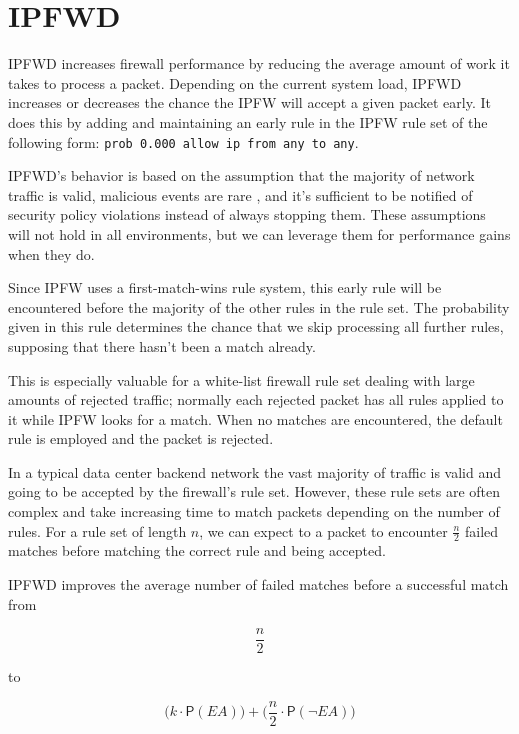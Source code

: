 \documentclass[journal]{IEEEtran}
\begin{document}
\section{IPFWD}

  IPFWD increases firewall performance by reducing the average amount of work
  it takes to process a packet. Depending on the current system load, IPFWD
  increases or decreases the chance the IPFW will accept a given packet early.
  It does this by adding and maintaining an early rule in the IPFW rule set of
  the following form: \verb|prob 0.000 allow ip from any to any|. 

  IPFWD's behavior is based on the assumption that the majority of network
  traffic is valid, malicious events are rare \cite{networktrafficanalysis},
  and it's sufficient to be notified of security policy violations instead of
  always stopping them. These assumptions will not hold in all environments,
  but we can leverage them for performance gains when they do.

  Since IPFW uses a first-match-wins rule system, this early rule will be
  encountered before the majority of the other rules in the rule set.  The
  probability given in this rule determines the chance that we skip processing
  all further rules, supposing that there hasn't been a match already.  

  This is especially valuable for a white-list firewall rule set dealing with
  large amounts of rejected traffic; normally each rejected packet has all
  rules applied to it while IPFW looks for a match.  When no matches are
  encountered, the default rule is employed and the packet is rejected. 

  In a typical data center backend network the vast majority of traffic is
  valid and going to be accepted by the firewall's rule set. However, these
  rule sets are often complex and take increasing time to match packets
  depending on the number of rules. For a rule set of length $n$, we can expect
  to a packet to encounter $\frac{n}{2}$ failed matches before matching the
  correct rule and being accepted.

  IPFWD improves the average number of failed matches before a successful match
  from

  \[
  \frac{n}{2}
  \]

  to

  \[
  \Big(k \cdot \mathsf{P}(\textit{EA})\Big) + 
  \Big(\frac{n}{2} \cdot \mathsf{P}(\neg{\textit{EA}})\Big) 
  \]
\end{document}
